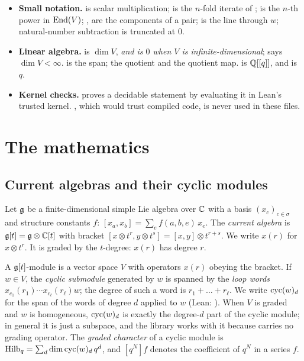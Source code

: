 \begin{itemize}
  $=\{0,\dots,n-1\}$;  $=\{(i,j):i+j=n\}$.
\item \textbf{Small notation.}  is scalar multiplication;  is the $n$-fold iterate of ;
   is the $n$-th power in $\operatorname{End}(V)$; ,  are the components of a pair;  is
  the line through $w$; natural-number subtraction is truncated at $0$.
\item \textbf{Linear algebra.}  is $\dim V$, \emph{and is $0$ when $V$ is infinite-dimensional};
   says $\dim V<\infty$.  is the span;  the quotient and
   the quotient map.  is ${\mathbb{Q}}[[q]]$, and  is $q$.
\item \textbf{Kernel checks.}  proves a decidable statement by evaluating it in Lean's trusted kernel.
  , which would trust compiled code, is never used in these files.
\end{itemize}

\section{The mathematics}\label{l26:sec:math}

\subsection{Current algebras and their cyclic modules}\label{l26:sec:current}

Let $\mathfrak g$ be a finite-dimensional simple Lie algebra over ${\mathbb{C}}$ with a basis $(x_c)_{c\in\sigma}$ and
structure constants $f$: $[x_a,x_b]=\sum_e f(a,b,e)\,x_e$. The \emph{current algebra} is
$\mathfrak g[t]=\mathfrak g\otimes{\mathbb{C}}[t]$ with bracket $[x\otimes t^r,y\otimes t^s]=[x,y]\otimes t^{r+s}$. We write
$x(r)$ for $x\otimes t^r$. It is graded by the $t$-degree: $x(r)$ has degree $r$.

A $\mathfrak g[t]$-module is a vector space $V$ with operators $x(r)$ obeying the bracket. If $w\in V$, the
\emph{cyclic submodule} generated by $w$ is spanned by the \emph{loop words} $x_{c_1}(r_1)\cdots x_{c_\ell}(r_\ell)w$;
the degree of such a word is $r_1+\dots+r_\ell$. We write $\operatorname{cyc}(w)_d$ for the span of the words of degree
$d$ applied to $w$ (Lean: ). When $V$ is graded and $w$ is homogeneous, $\operatorname{cyc}(w)_d$ is
exactly the degree-$d$ part of the cyclic module; in general it is just a subspace, and the library works with it
because  carries no grading operator. The \emph{graded character} of a cyclic module is
$\operatorname{Hilb}_q=\sum_d\dim\operatorname{cyc}(w)_d\,q^d$, and $[q^N]f$ denotes the coefficient of $q^N$ in a series $f$.


